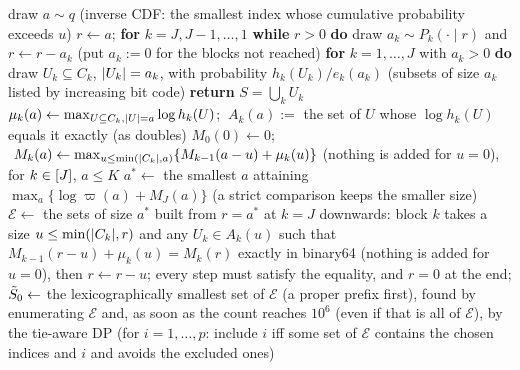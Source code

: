 \begin{algorithm}
{\begin{algorithmic}[1]
\State draw $a\sim q$ (inverse CDF: the smallest index whose cumulative probability exceeds $u$) %
\State $r\gets a$; \textbf{for} $k=J,J-1,\dots,1$ \textbf{while} $r>0$ \textbf{do} draw $a_k\sim P_k(\cdot\mid r)$ and $r\gets r-a_k$ (put $a_k:=0$ for the blocks not reached) %
\State \textbf{for} $k=1,\dots,J$ with $a_k>0$ \textbf{do} draw $U_k\subseteq C_k$, $\lvert U_k\rvert=a_k$, with probability $h_k(U_k)/e_k(a_k)$ (subsets of size $a_k$ listed by increasing bit code) %
\State \textbf{return} $S=\bigcup_kU_k$ %
\EndProcedure
{}
\State $\mu_k(a)\gets\max_{U\subseteq C_k,\lvert U\rvert=a}\log h_k(U)$; $\ A_k(a):=$ the set of $U$ whose $\log h_k(U)$ equals it exactly (as doubles) %
\State $M_0(0)\gets0$; $\ M_k(a)\gets\max_{u\le\min(\abs{C_k},a)}\{M_{k-1}(a-u)+\mu_k(u)\}$ (nothing is added for $u=0$), for $k\in[J]$, $a\le K$ %
\State $a^*\gets$ the smallest $a$ attaining $\max_a\{\log\varpi(a)+M_J(a)\}$ (a strict comparison keeps the smaller size) %
\State $\mathcal E\gets$ the sets of size $a^*$ built from $r=a^*$ at $k=J$ downwards: block $k$ takes a size $u\le\min(\lvert C_k\rvert,r)$ and any $U_k\in A_k(u)$ such that $M_{k-1}(r-u)+\mu_k(u)=M_k(r)$ exactly in binary64 (nothing is added for $u=0$), then $r\gets r-u$; every step must satisfy the equality, and $r=0$ at the end; $\tilde S_0\gets$ the lexicographically smallest set of $\mathcal E$ (a proper prefix first), found by enumerating $\mathcal E$ and, as soon as the count reaches $10^6$ (even if that is all of $\mathcal E$), by the tie-aware DP (for $i=1,\dots,p$: include $i$ iff some set of $\mathcal E$ contains the chosen indices and $i$ and avoids the excluded ones) %
\EndProcedure
\end{algorithmic}}
\end{algorithm}


